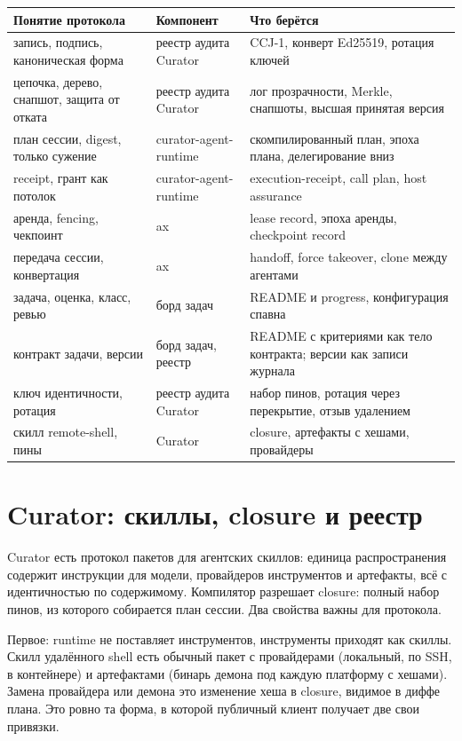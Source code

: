 \begin{center}
\small
\begin{tabular}{p{4.2cm} p{4.4cm} p{4.6cm}}
\toprule
Понятие протокола & Компонент & Что берётся \\
\midrule
запись, подпись, каноническая форма & реестр аудита Curator & CCJ-1, конверт Ed25519, ротация ключей \\
цепочка, дерево, снапшот, защита от отката & реестр аудита Curator & лог прозрачности, Merkle, снапшоты, высшая принятая версия \\
план сессии, digest, только сужение & curator-agent-runtime & скомпилированный план, эпоха плана, делегирование вниз \\
receipt, грант как потолок & curator-agent-runtime & execution-receipt, call plan, host assurance \\
аренда, fencing, чекпоинт & ax & lease record, эпоха аренды, checkpoint record \\
передача сессии, конвертация & ax & handoff, force takeover, clone между агентами \\
задача, оценка, класс, ревью & борд задач & README и progress, конфигурация спавна \\
контракт задачи, версии & борд задач, реестр & README с критериями как тело контракта; версии как записи журнала \\
ключ идентичности, ротация & реестр аудита Curator & набор пинов, ротация через перекрытие, отзыв удалением \\
скилл remote-shell, пины & Curator & closure, артефакты с хешами, провайдеры \\
\bottomrule
\end{tabular}
\end{center}

\section{Curator: скиллы, closure и реестр}

Curator есть протокол пакетов для агентских скиллов: единица распространения содержит инструкции для модели, провайдеров инструментов и артефакты, всё с идентичностью по содержимому. Компилятор разрешает closure: полный набор пинов, из которого собирается план сессии. Два свойства важны для протокола.

Первое: runtime не поставляет инструментов, инструменты приходят как скиллы. Скилл удалённого shell есть обычный пакет с провайдерами (локальный, по SSH, в контейнере) и артефактами (бинарь демона под каждую платформу с хешами). Замена провайдера или демона это изменение хеша в closure, видимое в диффе плана. Это ровно та форма, в которой публичный клиент получает две свои привязки.

